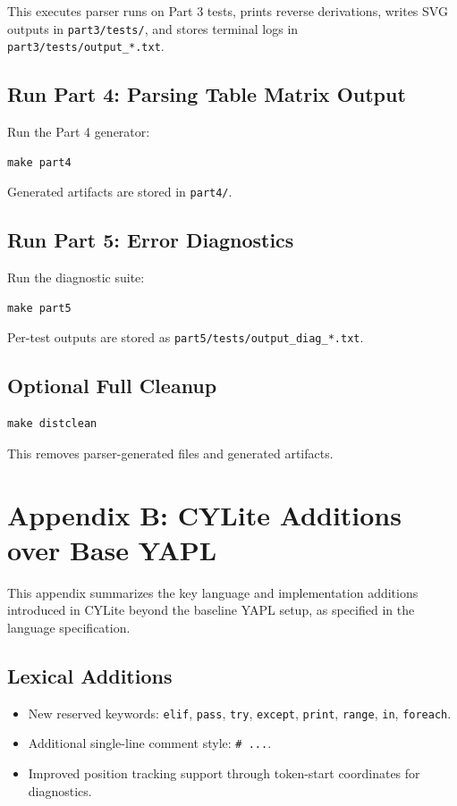 \documentclass[a4paper,12pt]{article}
\begin{document}
This executes parser runs on Part 3 tests, prints reverse derivations, writes SVG outputs in \texttt{part3/tests/}, and stores terminal logs in \texttt{part3/tests/output\_*.txt}.

\subsection{Run Part 4: Parsing Table Matrix Output}
Run the Part 4 generator:
\begin{lstlisting}
make part4
\end{lstlisting}

Generated artifacts are stored in \texttt{part4/}.

\subsection{Run Part 5: Error Diagnostics}
Run the diagnostic suite:
\begin{lstlisting}
make part5
\end{lstlisting}
Per-test outputs are stored as \texttt{part5/tests/output\_diag\_*.txt}.

\subsection{Optional Full Cleanup}
\begin{lstlisting}
make distclean
\end{lstlisting}
This removes parser-generated files and generated artifacts.


\newpage
\section{Appendix B: CYLite Additions over Base YAPL}

This appendix summarizes the key language and implementation additions introduced in CYLite beyond the baseline YAPL setup, as specified in the language specification.

\subsection{Lexical Additions}
\begin{itemize}
    \item New reserved keywords: \texttt{elif}, \texttt{pass}, \texttt{try}, \texttt{except}, \texttt{print}, \texttt{range}, \texttt{in}, \texttt{foreach}.
    \item Additional single-line comment style: \texttt{\# ...}.
    \item Improved position tracking support through token-start coordinates for diagnostics.
\end{itemize}
\end{document}
